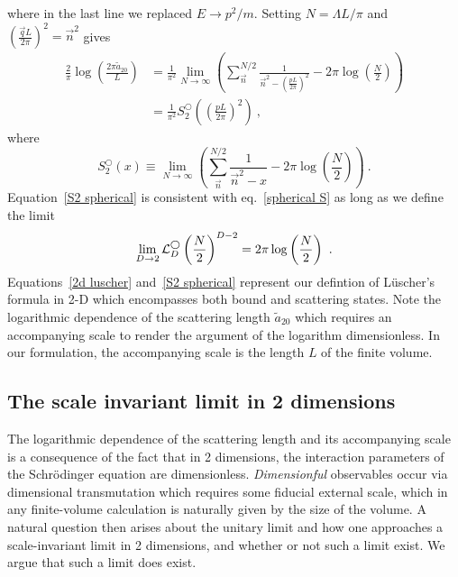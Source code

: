 where in the last line we replaced $E\to p^2/m$.  Setting $N=\Lambda L/\pi$ and $\left(\frac{\vec{q}L}{2\pi}\right)^2=\vec{n}^2$ gives
\begin{align}
\frac{2}{\pi} \log \left(\frac{2\pi \tilde a_{20}}{L}\right)&=\frac{1}{\pi^2}\lim_{N\to\infty}\left( \sum_{\vec{n}}^{N/2} \frac{1}{\vec{n}^2-\left(\frac{pL}{2\pi}\right)^2}-2\pi \log \left(\frac{N}{2}\right)\right)\nonumber\\
&=\frac{1}{\pi^2}S^\bigcirc_2\left(\left(\frac{pL}{2\pi}\right)^2\right)\ ,\label{eq:2d luscher}
\end{align}
where
\begin{equation}\label{eq:S2 spherical}
S^\bigcirc_2\left(x\right)\equiv\lim_{N\to\infty}\left( \sum_{\vec{n}}^{N/2} \frac{1}{\vec{n}^2-x}-2\pi \log \left(\frac{N}{2}\right)\right)\ .
\end{equation}
Equation~\eqref{S2 spherical} is consistent with eq.~\eqref{spherical S} as long as we define the limit
\begin{equation}
\lim_{D\to2}\counterterm_D^\spherical \left(\frac{N}{2}\right)^{D-2}=2\pi \log \left(\frac{N}{2}\right)\ .
\end{equation}
Equations~\eqref{2d luscher} and~\eqref{S2 spherical} represent our defintion of L\"uscher's formula in 2-D which encompasses both bound and scattering states.  Note the logarithmic dependence of the scattering length $\tilde a_{20}$ which requires an accompanying scale to render the argument of the logarithm dimensionless.  In our formulation, the accompanying scale is the length $L$ of the finite volume.   

\subsection{The scale invariant limit in 2 dimensions}
The logarithmic dependence of the scattering length and its accompanying scale is a consequence of the fact that in 2 dimensions, the interaction parameters of the Schr\"odinger equation are dimensionless.  \emph{Dimensionful} observables occur via dimensional transmutation \cite{} which requires some fiducial external scale, which in any finite-volume calculation is naturally given by the size of the volume.  A natural question then arises about the unitary limit and how one approaches a scale-invariant limit in 2 dimensions, and whether or not such a limit exist.  We argue that such a limit does exist.

